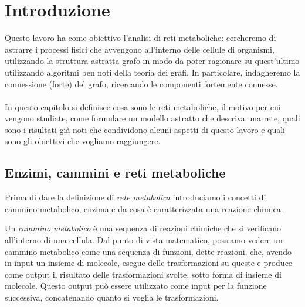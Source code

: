 \chapter{Introduzione}
\label{chapter:introduction}

Questo lavoro ha come obiettivo l'analisi di reti metaboliche:
cercheremo di astrarre i processi fisici che avvengono all'interno
delle cellule di organismi, utilizzando la struttura astratta grafo in
modo da poter ragionare su quest'ultimo utilizzando algoritmi ben noti
della teoria dei grafi. In particolare, indagheremo la connessione
(forte) del grafo, ricercando le componenti fortemente connesse.
\\\\
In questo capitolo si definisce cosa sono le reti metaboliche, il
motivo per cui vengono studiate, come formulare un modello astratto
che descriva una rete, quali sono i risultati gi\`a noti che
condividono alcuni aspetti di questo lavoro e quali sono gli obiettivi
che vogliamo raggiungere.




\section{Enzimi, cammini e reti metaboliche}

Prima di dare la definizione di \emph{rete metabolica} introduciamo i
concetti di cammino metabolico, enzima e da cosa \`e caratterizzata
una reazione chimica.

Un \emph{cammino metabolico} \`e una sequenza di reazioni chimiche che
si verificano all'interno di una cellula. Dal punto di vista
matematico, possiamo vedere un cammino metabolico come una sequenza di
funzioni, dette reazioni, che, avendo in input un insieme di molecole,
esegue delle trasformazioni su queste e produce come output il
risultato delle trasformazioni svolte, sotto forma di insieme di
molecole. Questo output pu\`o essere utilizzato come input per la
funzione successiva, concatenando quanto si voglia le trasformazioni.

